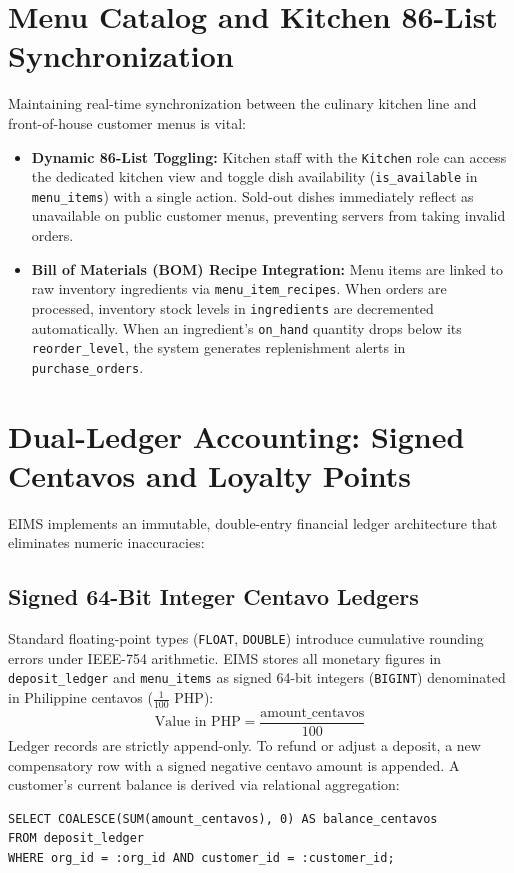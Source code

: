 \section{Menu Catalog and Kitchen 86-List Synchronization}
\label{sec:feat_kitchen_86}
Maintaining real-time synchronization between the culinary kitchen line and front-of-house customer menus is vital:
\begin{itemize}
    \item \textbf{Dynamic 86-List Toggling:} Kitchen staff with the \texttt{Kitchen} role can access the dedicated kitchen view and toggle dish availability (\texttt{is\_available} in \texttt{menu\_items}) with a single action. Sold-out dishes immediately reflect as unavailable on public customer menus, preventing servers from taking invalid orders.
    \item \textbf{Bill of Materials (BOM) Recipe Integration:} Menu items are linked to raw inventory ingredients via \texttt{menu\_item\_recipes}. When orders are processed, inventory stock levels in \texttt{ingredients} are decremented automatically. When an ingredient's \texttt{on\_hand} quantity drops below its \texttt{reorder\_level}, the system generates replenishment alerts in \texttt{purchase\_orders}.
\end{itemize}

\section{Dual-Ledger Accounting: Signed Centavos and Loyalty Points}
\label{sec:feat_dual_ledger}
EIMS implements an immutable, double-entry financial ledger architecture that eliminates numeric inaccuracies:

\subsection{Signed 64-Bit Integer Centavo Ledgers}
Standard floating-point types (\texttt{FLOAT}, \texttt{DOUBLE}) introduce cumulative rounding errors under IEEE-754 arithmetic. EIMS stores all monetary figures in \texttt{deposit\_ledger} and \texttt{menu\_items} as signed 64-bit integers (\texttt{BIGINT}) denominated in Philippine centavos ($\frac{1}{100}$ PHP):
\begin{equation}
    \text{Value in PHP} = \frac{\text{amount\_centavos}}{100}
\end{equation}
Ledger records are strictly append-only. To refund or adjust a deposit, a new compensatory row with a signed negative centavo amount is appended. A customer's current balance is derived via relational aggregation:
\begin{lstlisting}[language=SQLANSI]
SELECT COALESCE(SUM(amount_centavos), 0) AS balance_centavos
FROM deposit_ledger
WHERE org_id = :org_id AND customer_id = :customer_id;
\end{lstlisting}

